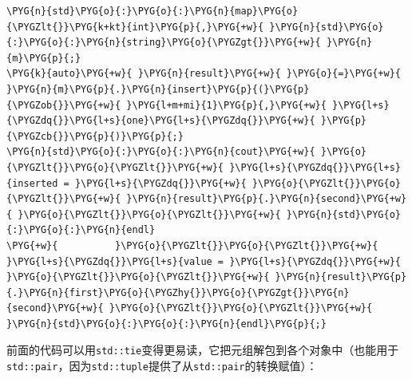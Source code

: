 \begin{codeblockbg}
\begin{Verbatim}[commandchars=\\\{\},breaklines=true,breakanywhere=true,fontsize=\codefont,xleftmargin=17bp]
\PYG{n}{std}\PYG{o}{:}\PYG{o}{:}\PYG{n}{map}\PYG{o}{\PYGZlt{}}\PYG{k+kt}{int}\PYG{p}{,}\PYG{+w}{ }\PYG{n}{std}\PYG{o}{:}\PYG{o}{:}\PYG{n}{string}\PYG{o}{\PYGZgt{}}\PYG{+w}{ }\PYG{n}{m}\PYG{p}{;}
\PYG{k}{auto}\PYG{+w}{ }\PYG{n}{result}\PYG{+w}{ }\PYG{o}{=}\PYG{+w}{ }\PYG{n}{m}\PYG{p}{.}\PYG{n}{insert}\PYG{p}{(}\PYG{p}{\PYGZob{}}\PYG{+w}{ }\PYG{l+m+mi}{1}\PYG{p}{,}\PYG{+w}{ }\PYG{l+s}{\PYGZdq{}}\PYG{l+s}{one}\PYG{l+s}{\PYGZdq{}}\PYG{+w}{ }\PYG{p}{\PYGZcb{}}\PYG{p}{)}\PYG{p}{;}
\PYG{n}{std}\PYG{o}{:}\PYG{o}{:}\PYG{n}{cout}\PYG{+w}{ }\PYG{o}{\PYGZlt{}}\PYG{o}{\PYGZlt{}}\PYG{+w}{ }\PYG{l+s}{\PYGZdq{}}\PYG{l+s}{inserted = }\PYG{l+s}{\PYGZdq{}}\PYG{+w}{ }\PYG{o}{\PYGZlt{}}\PYG{o}{\PYGZlt{}}\PYG{+w}{ }\PYG{n}{result}\PYG{p}{.}\PYG{n}{second}\PYG{+w}{ }\PYG{o}{\PYGZlt{}}\PYG{o}{\PYGZlt{}}\PYG{+w}{ }\PYG{n}{std}\PYG{o}{:}\PYG{o}{:}\PYG{n}{endl}
\PYG{+w}{          }\PYG{o}{\PYGZlt{}}\PYG{o}{\PYGZlt{}}\PYG{+w}{ }\PYG{l+s}{\PYGZdq{}}\PYG{l+s}{value = }\PYG{l+s}{\PYGZdq{}}\PYG{+w}{ }\PYG{o}{\PYGZlt{}}\PYG{o}{\PYGZlt{}}\PYG{+w}{ }\PYG{n}{result}\PYG{p}{.}\PYG{n}{first}\PYG{o}{\PYGZhy{}}\PYG{o}{\PYGZgt{}}\PYG{n}{second}\PYG{+w}{ }\PYG{o}{\PYGZlt{}}\PYG{o}{\PYGZlt{}}\PYG{+w}{ }\PYG{n}{std}\PYG{o}{:}\PYG{o}{:}\PYG{n}{endl}\PYG{p}{;}
\end{Verbatim}
\end{codeblockbg}



前面的代码可以用\texttt{std::\allowbreak{}tie}变得更易读，它把元组解包到各个对象中（也能用于\texttt{std::\allowbreak{}pair}，因为\texttt{std::\allowbreak{}tuple}提供了从\texttt{std::\allowbreak{}pair}的转换赋值）：




